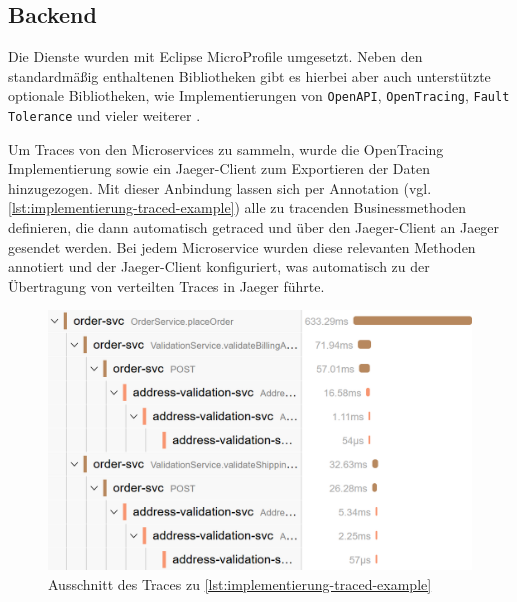 \subsection{Backend}

Die Dienste wurden mit Eclipse MicroProfile umgesetzt. Neben den standardmäßig enthaltenen Bibliotheken gibt es hierbei aber auch unterstützte optionale Bibliotheken, wie Implementierungen von \texttt{OpenAPI}, \texttt{OpenTracing}, \texttt{Fault Tolerance} und vieler weiterer \cite{EclipseMicroprofile}.

Um Traces von den Microservices zu sammeln, wurde die OpenTracing Implementierung sowie ein Jaeger-Client \cite{JaegerClient} zum Exportieren der Daten hinzugezogen. Mit dieser Anbindung lassen sich per Annotation (vgl. \autoref{lst:implementierung-traced-example}) alle zu tracenden Businessmethoden definieren, die dann automatisch getraced und über den Jaeger-Client an Jaeger gesendet werden. Bei jedem Microservice wurden diese relevanten Methoden annotiert und der Jaeger-Client konfiguriert, was automatisch zu der Übertragung von verteilten Traces in Jaeger führte.



\begin{figure}
\centering
\vspace{-\baselineskip}
\includegraphics[width=\linewidth]{img/04_erstellung-poc/implementierung_jaeger-trace-example.png}
\caption{Ausschnitt des Traces zu \autoref{lst:implementierung-traced-example}}
\label{fig:implementierung_jaeger-trace-example}
\end{figure}

